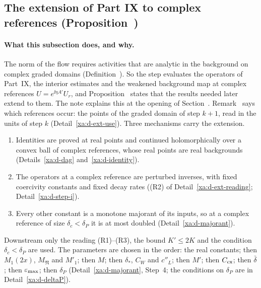\subsection{The extension of Part IX to complex references (Proposition~\texorpdfstring{}{46.7})}\label{xa:sec-ext}

\paragraph{What this subsection does, and why.} The norm of the flow requires activities that are analytic in the background on complex graded domains (Definition~). So the step evaluates the operators of Part~IX, the interior estimates and the weakened background map at complex references $U=e^{\ii\eta A'}U_r$, and Proposition~ states that the results needed later extend to them. The note explains this at the opening of Section~. Remark~ says which references occur: the points of the graded domain of step $k+1$, read in the units of step $k$ (Detail~\ref{xa:d-ext-use}). Three mechanisms carry the extension.
\begin{enumerate}[label=(\arabic*)]
\item Identities are proved at real points and continued holomorphically over a convex ball of complex references, whose real points are real backgrounds (Details~\ref{xa:d-dag} and~\ref{xa:d-identity}).
\item The operators at a complex reference are perturbed inverses, with fixed coercivity constants and fixed decay rates ((R2) of Detail~\ref{xa:d-ext-reading}; Detail~\ref{xa:d-step-i}).
\item Every other constant is a monotone majorant of its inputs, so at a complex reference of size $\delta_c<\delta_P$ it is at most doubled (Detail~\ref{xa:d-majorant}).
\end{enumerate}
Downstream only the reading (R1)--(R3), the bound $K'\le2K$ and the condition $\delta_c<\delta_P$ are used. The parameters are chosen in the order: the real constants; then $M_1(2x)$, $M_{\mathfrak N}$ and $M'_1$; then $M$; then $\delta_*$, $C_W$ and $c''_L$; then $M'$; then $C_{\rm cx}$; then $\bar\delta$; then $\varepsilon_{\max}$; then $\delta_P$ (Detail~\ref{xa:d-majorant}, Step~4; the conditions on $\delta_P$ are in Detail~\ref{xa:d-deltaP}).

